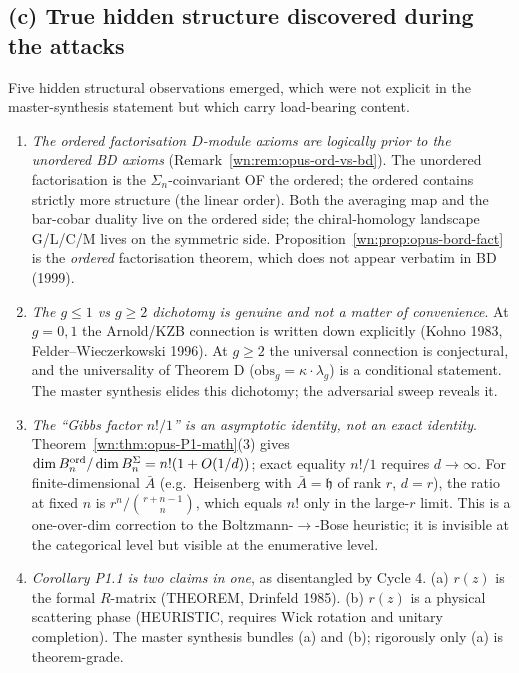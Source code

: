 \subsection*{(c) True hidden structure discovered during the attacks}

Five hidden structural observations emerged, which were not explicit in
the master-synthesis statement but which carry load-bearing content.

\begin{enumerate}
\item \emph{The ordered factorisation $D$-module axioms are
logically prior to the unordered BD axioms}
(Remark~\ref{wn:rem:opus-ord-vs-bd}). The unordered factorisation is
the $\Sigma_n$-coinvariant OF the ordered; the ordered contains strictly
more structure (the linear order). Both the averaging map and the
bar-cobar duality live on the ordered side; the chiral-homology
landscape G/L/C/M lives on the symmetric side. Proposition~\ref{wn:prop:opus-bord-fact}
is the \emph{ordered} factorisation theorem, which does not appear
verbatim in BD (1999).

\item \emph{The $g \le 1$ vs $g \ge 2$ dichotomy is genuine and
not a matter of convenience}. At $g = 0, 1$ the Arnold/KZB connection is
written down explicitly (Kohno 1983, Felder--Wieczerkowski 1996). At
$g \ge 2$ the universal connection is conjectural, and the universality
of Theorem D ($\mathrm{obs}_g = \kappa \cdot \lambda_g$) is a
conditional statement. The master synthesis elides this dichotomy; the
adversarial sweep reveals it.

\item \emph{The ``Gibbs factor $n!/1$'' is an asymptotic identity, not an
exact identity}. Theorem~\ref{wn:thm:opus-P1-math}(3) gives
$\dim B^{\mathrm{ord}}_n / \dim B^{\Sigma}_n = n!(1 + O(1/d))$; exact equality $n!/1$
requires $d \to \infty$. For finite-dimensional $\bar A$ (e.g.\
Heisenberg with $\bar A = \mathfrak{h}$ of rank $r$, $d = r$), the
ratio at fixed $n$ is $r^n / \binom{r+n-1}{n}$, which equals $n!$ only
in the large-$r$ limit. This is a one-over-dim correction to the
Boltzmann-$\to$-Bose heuristic; it is invisible at the categorical
level but visible at the enumerative level.

\item \emph{Corollary P1.1 is two claims in one}, as disentangled by
Cycle 4. (a) $r(z)$ is the formal $R$-matrix (THEOREM, Drinfeld 1985).
(b) $r(z)$ is a physical scattering phase (HEURISTIC, requires Wick
rotation and unitary completion). The master synthesis bundles (a) and
(b); rigorously only (a) is theorem-grade.


\end{enumerate}
